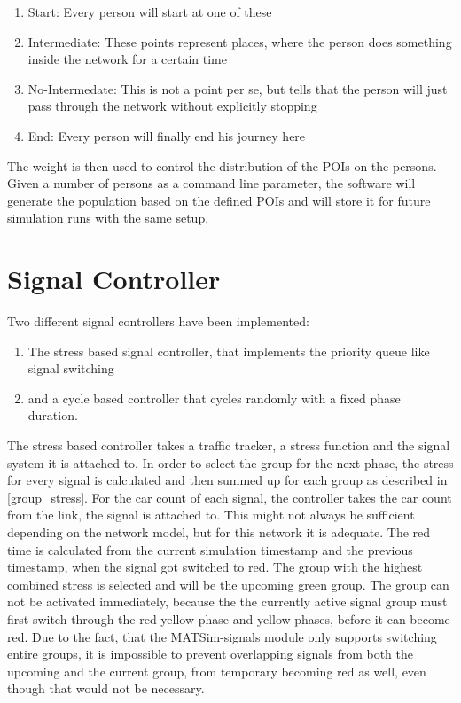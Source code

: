 \begin{enumerate}
	\item Start: Every person will start at one of these
	\item Intermediate: These points represent places, where the person does something inside the network for a certain time
	\item No-Intermedate: This is not a point per se, but tells that the person will just pass through the network without explicitly stopping
	\item End: Every person will finally end his journey here
\end{enumerate}

The weight is then used to control the distribution of the POIs on the persons. Given a number of persons as a command line parameter, the software will generate the population based on the defined POIs and will store it for future simulation runs with the same setup.

\section{Signal Controller}

Two different signal controllers have been implemented:

\begin{enumerate}
	\item The stress based signal controller, that implements the priority queue like signal switching
	\item and a cycle based controller that cycles randomly with a fixed phase duration.
\end{enumerate}

The stress based controller takes a traffic tracker, a stress function and the signal system it is attached to. In order to select the group for the next phase, the stress for every signal is calculated and then summed up for each group as described in \autoref{group_stress}. For the car count of each signal, the controller takes the car count from the link, the signal is attached to. This might not always be sufficient depending on the network model, but for this network it is adequate. The red time is calculated from the current simulation timestamp and the previous timestamp, when the signal got switched to red. The group with the highest combined stress is selected and will be the upcoming green group. The group can not be activated immediately, because the the currently active signal group must first switch through the red-yellow phase and yellow phases, before it can become red. Due to the fact, that the MATSim-signals module only supports switching entire groups, it is impossible to prevent overlapping signals from both the upcoming and the current group, from temporary becoming red as well, even though that would not be necessary.

